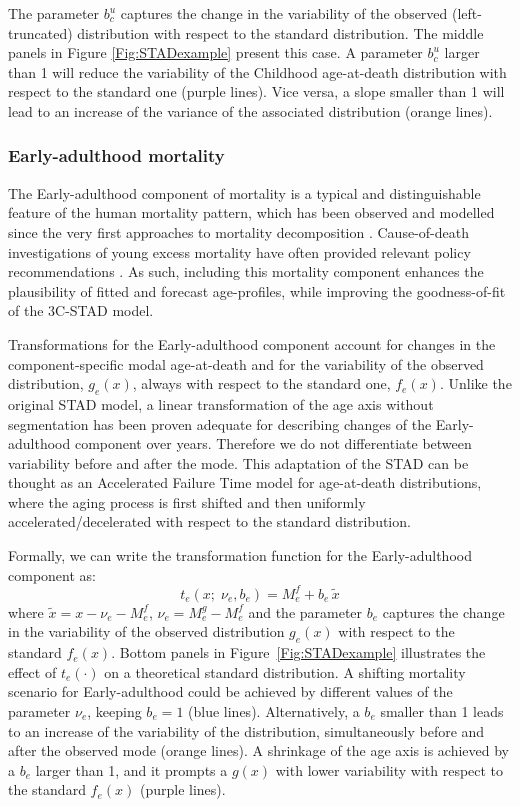 \documentclass[11pt, a4paper]{article}
\begin{document}
The parameter $b_{c}^{u}$ captures the change in the variability of the observed (left-truncated) distribution with respect to the standard distribution. The middle panels in Figure \ref{Fig:STADexample} present this case. A parameter $b_{c}^{u}$ larger than 1 will reduce the variability of the Childhood age-at-death distribution with respect to the standard one (purple lines). Vice versa, a slope smaller than 1 will lead to an increase of the variance of the associated distribution (orange lines). 

\subsubsection{Early-adulthood mortality}

The Early-adulthood component of mortality is a typical and distinguishable feature of the human mortality pattern, which has been observed and modelled since the very first approaches to mortality decomposition \cite[e.g.~][]{thiele1871mathematical,lexis1878duree,pearson1897chances}. Cause-of-death investigations of young excess mortality have often provided relevant policy recommendations \citep{heuveline2002international,remund2018young}. As such, including this mortality component enhances the plausibility of fitted and forecast age-profiles, while improving the goodness-of-fit of the 3C-STAD model.

Transformations for the Early-adulthood component account for changes in the component-specific modal age-at-death and for the variability of the observed distribution, $g_{e}(x)$, always with respect to the standard one, $f_{e}(x)$. Unlike the original STAD model, a linear transformation of the age axis without segmentation has been proven adequate for describing changes of the Early-adulthood component over years. Therefore we do not differentiate between variability before and after the mode. This adaptation of the STAD can be thought as an Accelerated Failure Time model for age-at-death distributions, where the aging process is first shifted and then uniformly accelerated/decelerated with respect to the standard distribution. 

Formally, we can write the transformation function for the Early-adulthood component as:
%
\begin{equation}\label{Eq:STADacc}
t_{e}(x;\;\nu_{e}, b_{e}) =  M_{e}^{f} + b_{e} \, \tilde{x} 
\end{equation} 
%
where $\tilde{x} = x - \nu_{e} - M_{e}^{f}$, $\nu_{e} = M_{e}^{g} - M_{e}^{f}$ and the parameter $b_{e}$ captures the change in the variability of the observed distribution $g_{e}(x)$ with respect to the standard $f_{e}(x)$. Bottom panels in Figure~\ref{Fig:STADexample} illustrates the effect of $t_{e}(\cdot)$ on a theoretical standard distribution. A shifting mortality scenario for Early-adulthood could be achieved by different values of the parameter $\nu_{e}$, keeping $b_{e}=1$ (blue lines). Alternatively, a $b_{e}$ smaller than 1 leads to an increase of the variability of the distribution, simultaneously before and after the observed mode (orange lines). A shrinkage of the age axis is achieved by a $b_{e}$ larger than 1, and it prompts a $g(x)$ with lower variability with respect to the standard $f_{e}(x)$ (purple lines). 
\end{document}
